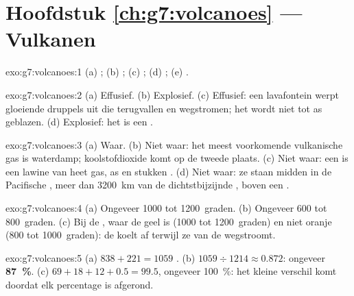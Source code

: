 \section*{Hoofdstuk \ref{ch:g7:volcanoes} --- Vulkanen}

\begin{solution}{exo:g7:volcanoes:1}
(a) ; (b) ; (c) ; (d) ; (e) .
\end{solution}

\begin{solution}{exo:g7:volcanoes:2}
(a) Effusief. (b) Explosief. (c) Effusief: een lavafontein werpt gloeiende
druppels uit die terugvallen en wegstromen; het  wordt niet tot as
geblazen. (d) Explosief: het is een .
\end{solution}

\begin{solution}{exo:g7:volcanoes:3}
(a) Waar. (b) Niet waar: het meest voorkomende vulkanische gas is
waterdamp; koolstofdioxide komt op de tweede plaats. (c) Niet waar: een
 is een lawine van heet gas, as en stukken .
(d) Niet waar: ze staan midden in de Pacifische , meer dan 3200~km van
de dichtstbijzijnde , boven een .
\end{solution}

\begin{solution}{exo:g7:volcanoes:4}
(a) Ongeveer 1000 tot 1200~graden. (b) Ongeveer 600 tot 800~graden. (c) Bij
de , waar de  geel is (1000 tot 1200~graden) en niet
oranje (800 tot 1000~graden): de  koelt af terwijl ze van de
 wegstroomt.
\end{solution}

\begin{solution}{exo:g7:volcanoes:5}
(a) $838 + 221 = 1059$ . (b) $1059 \div 1214 \approx 0.872$:
ongeveer \textbf{87~\%}. (c) $69 + 18 + 12 + 0.5 = 99.5$, ongeveer 100~\%:
het kleine verschil komt doordat elk percentage is afgerond.
\end{solution}

